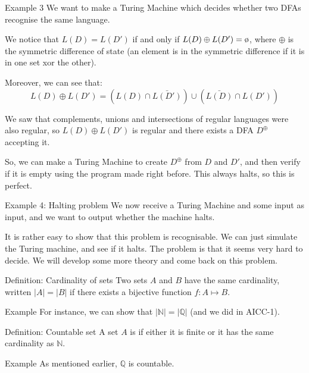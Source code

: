 \documentclass[a4paper]{article}
\begin{document}
\begin{parag}{Example 3}
    We want to make a Turing Machine which decides whether two DFAs recognise the same language. 

    We notice that $L\left(D\right) = L\left(D'\right)$ if and only if $L\left(D\right) \oplus L\left(D'\right) = \o$, where $\oplus$ is the symmetric difference of state (an element is in the symmetric difference if it is in one set xor the other).

    Moreover, we can see that: 
    \[L\left(D\right) \oplus L\left(D'\right) = \left(L\left(D\right) \cap \bar{L\left(D'\right)}\right) \cup \left(\bar{L\left(D\right)} \cap L\left(D'\right)\right)\]

    We saw that complements, unions and intersections of regular languages were also regular, so $L\left(D\right) \oplus L\left(D'\right)$ is regular and there exists a DFA $D^{\oplus}$ accepting it. 

    So, we can make a Turing Machine to create $D^{\oplus}$ from $D$ and $D'$, and then verify if it is empty using the program made right before. This always halts, so this is perfect.
\end{parag}

\begin{parag}{Example 4: Halting problem}
    We now receive a Turing Machine and some input as input, and we want to output whether the machine halts. 

    It is rather easy to show that this problem is recognisable. We can just simulate the Turing machine, and see if it halts. The problem is that it seems very hard to decide. We will develop some more theory and come back on this problem.
\end{parag}

\begin{parag}{Definition: Cardinality of sets}
    Two sets $A$ and $B$ have the same cardinality, written $\left|A\right| = \left|B\right|$ if there exists a bijective function $f: A \mapsto B$.

    \begin{subparag}{Example}
        For instance, we can show that $\left|\mathbb{N}\right| = \left|\mathbb{Q}\right|$ (and we did in AICC-1).
    \end{subparag}
    
\end{parag}

\begin{parag}{Definition: Countable set}
    A set $A$ is  if either it is finite or it has the same cardinality as $\mathbb{N}$.

    \begin{subparag}{Example}
        As mentioned earlier, $\mathbb{Q}$ is countable.
    \end{subparag}
\end{parag}
\end{document}
